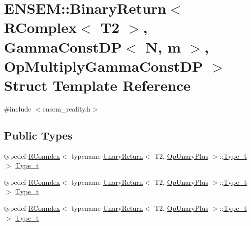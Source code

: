 \hypertarget{structENSEM_1_1BinaryReturn_3_01RComplex_3_01T2_01_4_00_01GammaConstDP_3_01N_00_01m_01_4_00_01OpMultiplyGammaConstDP_01_4}{}\section{E\+N\+S\+EM\+:\+:Binary\+Return$<$ R\+Complex$<$ T2 $>$, Gamma\+Const\+DP$<$ N, m $>$, Op\+Multiply\+Gamma\+Const\+DP $>$ Struct Template Reference}
\label{structENSEM_1_1BinaryReturn_3_01RComplex_3_01T2_01_4_00_01GammaConstDP_3_01N_00_01m_01_4_00_01OpMultiplyGammaConstDP_01_4}


{\ttfamily \#include $<$ensem\+\_\+reality.\+h$>$}

\subsection*{Public Types}
\begin{DoxyCompactItemize}
\item 
typedef \mbox{\hyperlink{classENSEM_1_1RComplex}{R\+Complex}}$<$ typename \mbox{\hyperlink{structENSEM_1_1UnaryReturn}{Unary\+Return}}$<$ T2, \mbox{\hyperlink{structENSEM_1_1OpUnaryPlus}{Op\+Unary\+Plus}} $>$\+::\mbox{\hyperlink{structENSEM_1_1BinaryReturn_3_01RComplex_3_01T2_01_4_00_01GammaConstDP_3_01N_00_01m_01_4_00_01OpMultiplyGammaConstDP_01_4_aea7c67b0aab65299ac861f01f5ec8737}{Type\+\_\+t}} $>$ \mbox{\hyperlink{structENSEM_1_1BinaryReturn_3_01RComplex_3_01T2_01_4_00_01GammaConstDP_3_01N_00_01m_01_4_00_01OpMultiplyGammaConstDP_01_4_aea7c67b0aab65299ac861f01f5ec8737}{Type\+\_\+t}}
\item 
typedef \mbox{\hyperlink{classENSEM_1_1RComplex}{R\+Complex}}$<$ typename \mbox{\hyperlink{structENSEM_1_1UnaryReturn}{Unary\+Return}}$<$ T2, \mbox{\hyperlink{structENSEM_1_1OpUnaryPlus}{Op\+Unary\+Plus}} $>$\+::\mbox{\hyperlink{structENSEM_1_1BinaryReturn_3_01RComplex_3_01T2_01_4_00_01GammaConstDP_3_01N_00_01m_01_4_00_01OpMultiplyGammaConstDP_01_4_aea7c67b0aab65299ac861f01f5ec8737}{Type\+\_\+t}} $>$ \mbox{\hyperlink{structENSEM_1_1BinaryReturn_3_01RComplex_3_01T2_01_4_00_01GammaConstDP_3_01N_00_01m_01_4_00_01OpMultiplyGammaConstDP_01_4_aea7c67b0aab65299ac861f01f5ec8737}{Type\+\_\+t}}
\item 
typedef \mbox{\hyperlink{classENSEM_1_1RComplex}{R\+Complex}}$<$ typename \mbox{\hyperlink{structENSEM_1_1UnaryReturn}{Unary\+Return}}$<$ T2, \mbox{\hyperlink{structENSEM_1_1OpUnaryPlus}{Op\+Unary\+Plus}} $>$\+::\mbox{\hyperlink{structENSEM_1_1BinaryReturn_3_01RComplex_3_01T2_01_4_00_01GammaConstDP_3_01N_00_01m_01_4_00_01OpMultiplyGammaConstDP_01_4_aea7c67b0aab65299ac861f01f5ec8737}{Type\+\_\+t}} $>$ \mbox{\hyperlink{structENSEM_1_1BinaryReturn_3_01RComplex_3_01T2_01_4_00_01GammaConstDP_3_01N_00_01m_01_4_00_01OpMultiplyGammaConstDP_01_4_aea7c67b0aab65299ac861f01f5ec8737}{Type\+\_\+t}}
\end{DoxyCompactItemize}


